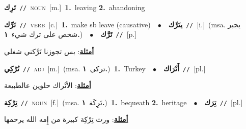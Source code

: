 \documentclass[10pt,a4paper,twoside]{article} %
\begin{document}
\begin{multicols}{2}
{{{{{{{{{\setlength\topsep{0pt}\textbf{\foreignlanguage{arabic}{تَرِك}}\ {\color{gray}\texttt{//}\color{black}}\ \textsc{noun}\ [m.]\ \textbf{1.}~leaving  \textbf{2.}~abandoning\ 

{\setlength\topsep{0pt}\textbf{\foreignlanguage{arabic}{تَرِّك}}\ {\color{gray}\texttt{//}\color{black}}\ \textsc{verb}\ [c.]\ \textbf{1.}~make sb leave (causative)\ \ $\bullet$\ \ \setlength\topsep{0pt}\textbf{\foreignlanguage{arabic}{يتَرِّك}}\ {\color{gray}\texttt{//}\color{black}}\ [i.]\ \color{gray}(msa. \foreignlanguage{arabic}{يجبر شخص على ترك شيء}~\foreignlanguage{arabic}{\textbf{١.}})\color{black}\ \ $\bullet$\ \ \setlength\topsep{0pt}\textbf{\foreignlanguage{arabic}{تَرَّك}}\ {\color{gray}\texttt{//}\color{black}}\ [p.]\  \begin{flushright}\color{gray}\foreignlanguage{arabic}{\textbf{\underline{\foreignlanguage{arabic}{أمثلة}}}: بس تجوزنا تَرَّكني شغلي}\end{flushright}\color{black}} \vspace{2mm}

{\setlength\topsep{0pt}\textbf{\foreignlanguage{arabic}{تُرْكِي}}\ {\color{gray}\texttt{//}\color{black}}\ \textsc{adj}\ [m.]\ \color{gray}(msa. \foreignlanguage{arabic}{تركي}~\foreignlanguage{arabic}{\textbf{١.}})\color{black}\ \textbf{1.}~Turkey\ \ $\bullet$\ \ \setlength\topsep{0pt}\textbf{\foreignlanguage{arabic}{أَتْرَاك}}\ {\color{gray}\texttt{//}\color{black}}\ [pl.]\  \begin{flushright}\color{gray}\foreignlanguage{arabic}{\textbf{\underline{\foreignlanguage{arabic}{أمثلة}}}: الأتْراك حلوين عالطبيعة}\end{flushright}\color{black}} \vspace{2mm}

{\setlength\topsep{0pt}\textbf{\foreignlanguage{arabic}{تِرْكِة}}\ {\color{gray}\texttt{//}\color{black}}\ \textsc{noun}\ [f.]\ \color{gray}(msa. \foreignlanguage{arabic}{تَرِكَة}~\foreignlanguage{arabic}{\textbf{١.}})\color{black}\ \textbf{1.}~bequeath  \textbf{2.}~heritage\ \ $\bullet$\ \ \setlength\topsep{0pt}\textbf{\foreignlanguage{arabic}{تِرَك}}\ {\color{gray}\texttt{//}\color{black}}\ [pl.]\  \begin{flushright}\color{gray}\foreignlanguage{arabic}{\textbf{\underline{\foreignlanguage{arabic}{أمثلة}}}: ورث تِرْكِة كبيرة من إِمه الله يرحمها}\end{flushright}\color{black}} \vspace{2mm}

}}}}}}}}}
\end{multicols}
\end{document}
